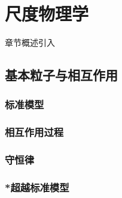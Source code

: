 \chapter{尺度物理学}\label{30}

章节概述引入

\section{基本粒子与相互作用}\label{30-1}

\subsection{标准模型}\label{30-1-1}

\subsection{相互作用过程}\label{30-1-2}

\subsection{守恒律}\label{30-1-3}

\subsection{*超越标准模型}\label{30-1-4}
